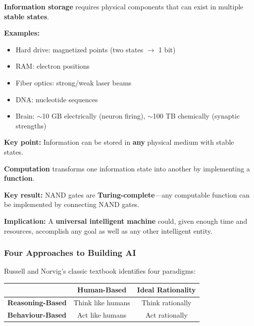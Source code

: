 \begin{defbox}[Information]
\textbf{Information storage} requires physical components that can exist in multiple \textbf{stable states}.

\textbf{Examples:}
\begin{itemize}
  \item Hard drive: magnetized points (two states $\to$ 1 bit)
  \item RAM: electron positions
  \item Fiber optics: strong/weak laser beams
  \item DNA: nucleotide sequences
  \item Brain: $\sim$10 GB electrically (neuron firing), $\sim$100 TB chemically (synaptic strengths)
\end{itemize}

\textbf{Key point:} Information can be stored in \textbf{any} physical medium with stable states.
\end{defbox}

\begin{defbox}[Computation]
\textbf{Computation} transforms one information state into another by implementing a \textbf{function}.

\textbf{Key result:} NAND gates are \textbf{Turing-complete}---any computable function can be implemented by connecting NAND gates.

\textbf{Implication:} A \textbf{universal intelligent machine} could, given enough time and resources, accomplish any goal as well as any other intelligent entity.
\end{defbox}

\bigseparator

\subsubsection{Four Approaches to Building AI}

Russell and Norvig's classic textbook identifies four paradigms:

\begin{center}
\renewcommand{\arraystretch}{1.4}
\begin{tabular}{@{} l | c c @{}}
\toprule
 & \textbf{Human-Based} & \textbf{Ideal Rationality} \\
\midrule
\textbf{Reasoning-Based} & Think like humans & Think rationally \\
\textbf{Behaviour-Based} & Act like humans & Act rationally \\
\bottomrule
\end{tabular}
\end{center}

